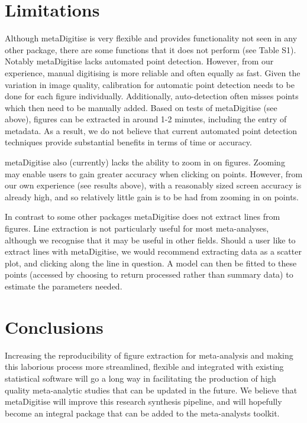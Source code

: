 \documentclass[12pt]{article}
\newcommand{\pkg}[1]{{\fontseries{b}\selectfont #1}}
\begin{document}




\section{Limitations}

Although \pkg{metaDigitise} is very flexible and provides functionality not seen in any other package, there are some functions that it does not perform (see Table S1). Notably \pkg{metaDigitise} lacks automated point detection. However, from our experience, manual digitising is more reliable and often equally as fast. Given the variation in image quality, calibration for automatic point detection needs to be done for each figure individually. Additionally, auto-detection often misses points which then need to be manually added. Based on tests of \pkg{metaDigitise} (see above), figures can be extracted in around 1-2 minutes, including the entry of metadata. As a result, we do not believe that current automated point detection techniques provide substantial benefits in terms of time or accuracy.

\pkg{metaDigitise} also (currently) lacks the ability to zoom in on figures. Zooming may enable users to gain greater accuracy when clicking on points. However, from our own experience (see results above), with a reasonably sized screen accuracy is already high, and so relatively little gain is to be had from zooming in on points.

In contrast to some other packages \pkg{metaDigitise} does not extract lines from figures. Line extraction is not particularly useful for most meta-analyses, although we recognise that it may be useful in other fields. Should a user like to extract lines with \pkg{metaDigitise}, we would recommend extracting data as a scatter plot, and clicking along the line in question. A model can then be fitted to these points (accessed by choosing to return processed rather than summary data) to estimate the parameters needed.





\section{Conclusions}
Increasing the reproducibility of figure extraction for meta-analysis and making this laborious process more streamlined, flexible and integrated with existing statistical software will go a long way in facilitating the production of high quality meta-analytic studies that can be updated in the future. We believe that \pkg{metaDigitise} will improve this research synthesis pipeline, and will hopefully become an integral package that can be added to the meta-analysts toolkit.
\end{document}
